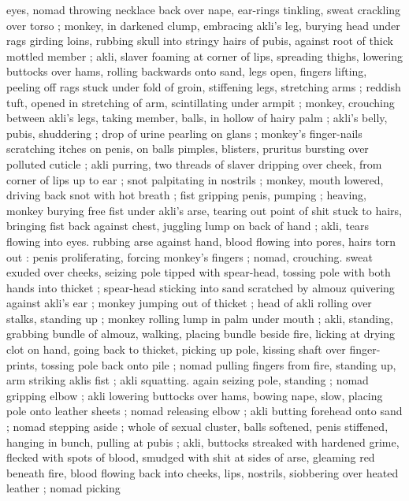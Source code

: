 eyes, nomad throwing necklace back over nape, ear-rings tinkling, 
sweat crackling over torso ; monkey, in darkened clump, embracing 
akli's leg, burying head under rags girding loins, rubbing skull into 
stringy hairs of pubis, against root of thick mottled member ; akli, 
slaver foaming at corner of lips, spreading thighs, lowering buttocks 
over hams, rolling backwards onto sand, legs open, fingers lifting, 
peeling off rags stuck under fold of groin, stiffening legs, stretching 
arms ; reddish tuft, opened in stretching of arm, scintillating under 
armpit ; monkey, crouching between akli's legs, taking member, balls, 
in hollow of hairy palm ; akli's belly, pubis, shuddering ; drop of 
urine pearling on glans ; monkey's finger-nails scratching itches on 
penis, on balls {\col} pimples, blisters, pruritus bursting over polluted 
cuticle ; akli purring, two threads of slaver dripping over cheek, from 
corner of lips up to ear ; snot palpitating in nostrils ; monkey, mouth 
lowered, driving back snot with hot breath ; fist gripping penis, 
pumping ; heaving, monkey burying free fist under akli's arse, 
tearing out point of shit stuck to hairs, bringing fist back against 
chest, juggling lump on back of hand ; akli, tears flowing into eyes. 
rubbing arse against hand, blood flowing into pores, hairs torn out : 
penis proliferating, forcing monkey's fingers ; nomad, crouching. 
sweat exuded over cheeks, seizing pole tipped with spear-head, 
tossing pole with both hands into thicket ; spear-head sticking into 
sand scratched by almouz quivering against akli's ear ; monkey 
jumping out of thicket ; head of akli rolling over stalks, standing up 
; monkey rolling lump in palm under mouth ; akli, standing, grabbing 
bundle of almouz, walking, placing bundle beside fire, licking at 
drying clot on hand, going back to thicket, picking up pole, kissing 
shaft over finger-prints, tossing pole back onto pile ; nomad pulling 
fingers from fire, standing up, arm striking aklis fist ; akli squatting. 
again seizing pole, standing ; nomad gripping elbow ; akli lowering 
buttocks over hams, bowing nape, slow, placing pole onto leather 
sheets ; nomad releasing elbow ; akli butting forehead onto sand ; 
nomad stepping aside ; whole of sexual cluster, balls softened, penis 
stiffened, hanging in bunch, pulling at pubis ; akli, buttocks streaked 
with hardened grime, flecked with spots of blood, smudged with shit 
at sides of arse, gleaming red beneath fire, blood flowing back into 
cheeks, lips, nostrils, siobbering over heated leather ; nomad picking 
